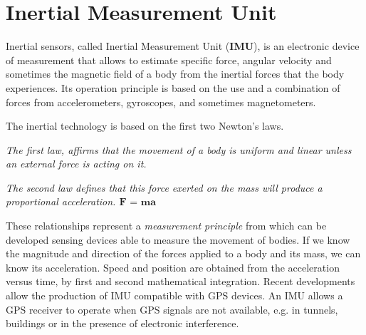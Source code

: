 \documentclass[tesi]{subfiles}
\begin{document}
\chapter{Inertial Measurement Unit}
\label{ch:Inertial Measurement Unit}
Inertial sensors, called Inertial Measurement Unit (\textbf{IMU}), is an electronic device of measurement that allows to estimate specific force, angular velocity and sometimes the magnetic field of a body from the inertial forces that the body experiences. Its operation principle is based on the use and a combination of forces from accelerometers, gyroscopes, and sometimes magnetometers.
\begin{center}
The inertial technology is based on the first two Newton’s laws. 

 \textit{The first law, affirms that the movement of a body is uniform and linear unless an external force is acting on it.} 

 \textit{The second law defines that this force exerted on the mass will produce a proportional acceleration. $ \textbf{F = ma} $
} 
\end{center} 

These relationships represent a \textit{measurement principle} from which can be developed sensing devices  able to measure the movement of bodies.
If we know the magnitude and direction of the forces applied to a body and its mass, we can know its acceleration. Speed and position are obtained from the acceleration versus time, by first and second mathematical integration.
Recent developments allow the production of IMU compatible with GPS devices. An IMU allows a GPS receiver to operate when GPS signals are not available, e.g. in tunnels, buildings or in the presence of electronic interference\cite{gpssystem}.
\newpage
\end{document}
